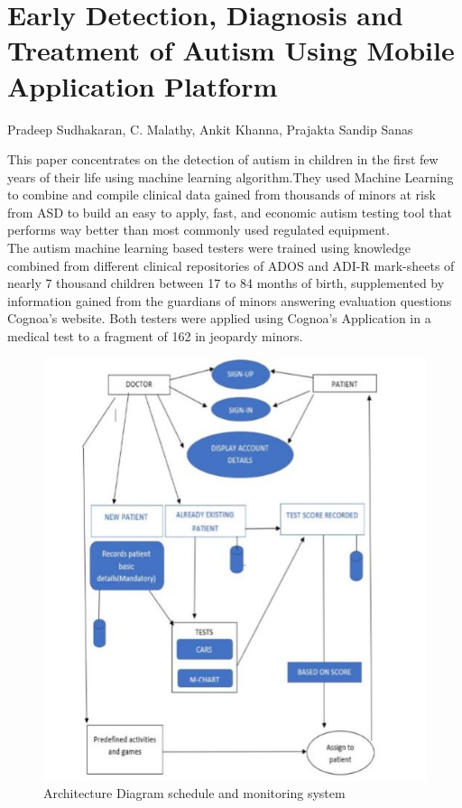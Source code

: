 \section{Early Detection, Diagnosis and Treatment of Autism Using Mobile Application Platform }
Pradeep Sudhakaran, C. Malathy, Ankit Khanna, Prajakta Sandip Sanas   

This paper concentrates on the detection of autism in children in the first few years of their life using machine learning algorithm.They used Machine Learning to combine and compile clinical data gained from thousands of minors at risk from ASD to build an easy to apply, fast, and economic autism testing tool that performs way better than most commonly used regulated equipment.\\
The autism machine learning based testers were trained using knowledge combined from different clinical repositories of ADOS and ADI-R mark-sheets of nearly 7 thousand children between 17 to 84 months of birth, supplemented by information gained from the guardians of minors answering evaluation questions Cognoa's website. Both testers were applied using Cognoa's Application in a medical test to a fragment of 162 in jeopardy minors.\\
\begin{figure}[h]
\label{ss}
\centering
\includegraphics[width= 14 cm]{Architecture Diagram schedule and monitoring system.jpg}
\caption{Architecture Diagram schedule and monitoring system}
\end{figure}

